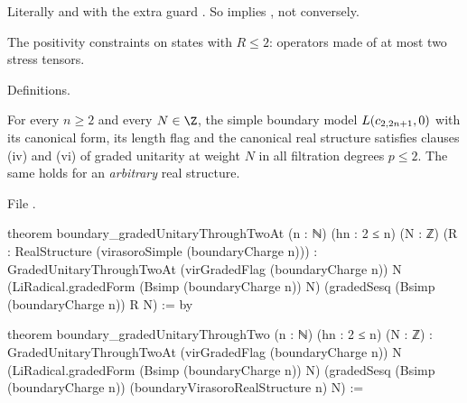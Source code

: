 \begin{dictionary}
Literally  and  with the extra guard . So
 implies , not conversely.
\end{dictionary}

\begin{physics}
The positivity constraints on states with $R\le2$: operators made of at most two stress tensors.
\end{physics}

\begin{status}
Definitions.
\end{status}

\begin{theorem}\label{l19:thm:throughtwo}
For every $n\ge2$ and every $N\in\Z$, the simple boundary model $L(c_{2,2n+1},0)$ with its canonical
form, its length flag and the canonical real structure satisfies clauses (iv) and (vi) of graded
unitarity at weight $N$ in all filtration degrees $p\le2$. The same holds for an \emph{arbitrary} real
structure.
\end{theorem}

\noindent File .
\begin{leancode}
theorem boundary_gradedUnitaryThroughTwoAt (n : ℕ) (hn : 2 ≤ n) (N : ℤ)
    (R : RealStructure (virasoroSimple (boundaryCharge n))) :
    GradedUnitaryThroughTwoAt (virGradedFlag (boundaryCharge n)) N
      (LiRadical.gradedForm (Bsimp (boundaryCharge n)) N)
      (gradedSesq (Bsimp (boundaryCharge n)) R N) := by

theorem boundary_gradedUnitaryThroughTwo (n : ℕ) (hn : 2 ≤ n) (N : ℤ) :
    GradedUnitaryThroughTwoAt (virGradedFlag (boundaryCharge n)) N
      (LiRadical.gradedForm (Bsimp (boundaryCharge n)) N)
      (gradedSesq (Bsimp (boundaryCharge n)) (boundaryVirasoroRealStructure n) N) :=
\end{leancode}

